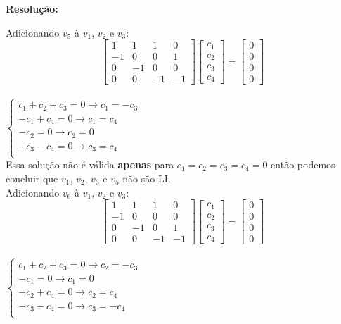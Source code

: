 \documentclass[leqno]{article}
\numberwithin{equation}{section}
\newenvironment{sol}
{
	\vspace{4mm}
	\noindent\textbf{Resolução:}
	\strut\newline
	\smallskip
	\hspace{-3.5mm}
}
{}
\begin{document}
\begin{enumerate}
\begin{sol}
		
		Adicionando $v_5$ à $v_1$, $v_2$ e $v_3$:
			$$\begin{bmatrix} 
			1 & 1 & 1 & 0\\
			-1 & 0 & 0 & 1\\
			0 & -1 & 0 & 0\\
			0 & 0 & -1 & -1\end{bmatrix}
			\begin{bmatrix} 
				c_1\\
				c_2\\
				c_3\\
				c_4
			\end{bmatrix} =
			\begin{bmatrix} 
				0\\
				0\\
				0\\
				0
			\end{bmatrix}$$ \\
		$
		\left\{
		\begin {array}{cl}
		c_1 + c_2 + c_3 = 0 \rightarrow c_1 = -c_3\\
		-c_1 + c_4 = 0 \rightarrow c_1 = c_4 \\
		-c_2 = 0 \rightarrow c_2 = 0\\
		-c_3 - c_4 = 0 \rightarrow c_3 = c_4\\
		\end{array}
		\right.
		$\\
		
		Essa solução não é válida \textbf{apenas} para $c_1 = c_2 = c_3 = c_4 = 0$ então podemos concluir que $v_1$, $v_2$, $v_3$ e $v_5$ não são LI.\\
		
		Adicionando $v_6$ à $v_1$, $v_2$ e $v_3$:
		$$\begin{bmatrix} 
			1 & 1 & 1 & 0\\
			-1 & 0 & 0 & 0\\
			0 & -1 & 0 & 1\\
			0 & 0 & -1 & -1\end{bmatrix}
		\begin{bmatrix} 
			c_1\\
			c_2\\
			c_3\\
			c_4
		\end{bmatrix} =
		\begin{bmatrix} 
			0\\
			0\\
			0\\
			0
		\end{bmatrix}$$ \\
		$
		\left\{
		\begin {array}{cl}
		c_1 + c_2 + c_3 = 0 \rightarrow c_2 = -c_3\\
		-c_1 = 0 \rightarrow c_1 = 0\\
		-c_2 + c_4 = 0 \rightarrow c_2 = c_4\\
		-c_3 - c_4 = 0 \rightarrow c_3 = -c_4\\
		\end{array}
		\right.
		$\\
		

\end{sol}
\end{enumerate}
\end{document}
